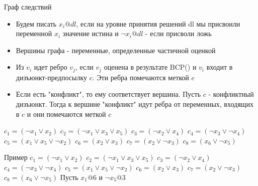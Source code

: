 \documentclass{beamer}
\begin{document}
\begin{frame}{Граф следствий}
\begin{itemize}
\item Будем писать $x_i@dl$, если на уровне принятия решений dl мы присвоили переменной $x_i$ значение истина и $\lnot x_i@dl$ -
если присволи ложь
\item Вершины графа - переменные, определенные частичной оценкой
\item Из $v_i$ идет ребро $v_j$, если $v_j$ оценена в результате BCP() и $v_i$ входит в дизъюнкт-предпосылку $c$. Эти ребра
помечаются меткой $c$
\item Если есть "конфликт", то ему соответствует вершина. Пусть $c$ - конфликтный дизъюнкт. Тогда к вершине "конфликт" идут
ребра от переменных, входящих в $c$ и они помечаются меткой $c$
\end{itemize}
\end{frame}

\begin{frame}
$c_1 = (\lnot x_1 \vee x_2 )$\newline
$c_2 = (\lnot x_1 \vee x_3 \vee x_5 )$\newline
$c_3 = (\lnot x_2 \vee x_4 )$\newline
$c_4 = (\lnot x_3 \vee \lnot x_4 )$\newline
$c_5 = (x_1 \vee x_5 \vee \lnot x_2 )$\newline
$c_6 = (x_2 \vee x_3 )$\newline
$c_7 = (x_2 \vee \lnot x_3 )$\newline
$c_8 = (x_6 \vee \lnot x_5 )$\newline
\end{frame}

\begin{frame}{Пример}
$c_1 = (\lnot x_1 \vee x_2 )$\newline
$c_2 = (\lnot x_1 \vee x_3 \vee x_5 )$\newline
$c_3 = (\lnot x_2 \vee x_4 )$\newline
$c_4 = (\lnot x_3 \vee \lnot x_4 )$\newline
$c_5 = (x_1 \vee x_5 \vee \lnot x_2 )$\newline
$c_6 = (x_2 \vee x_3 )$\newline
$c_7 = (x_2 \vee \lnot x_3 )$\newline
$c_8 = (x_6 \vee \lnot x_5 )$\newline
Пусть $x_1@6$ и $\lnot x_5@3$
\end{frame}
\end{document}
